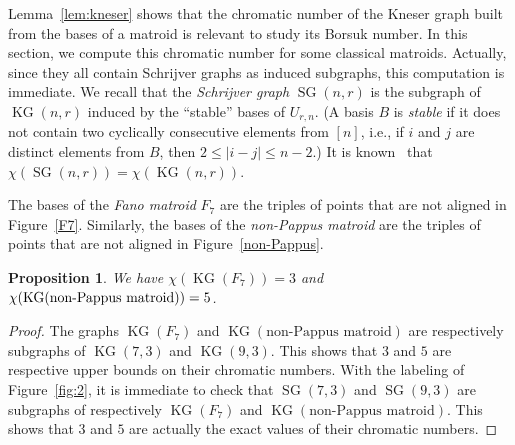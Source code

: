 \documentclass[12pt]{amsart}
\theoremstyle{plain}
\newtheorem{proposition}[theorem]{Proposition}
\theoremstyle{definition}
\theoremstyle{remark}
\renewcommand{\leq}{\leqslant}
\def \KG {\operatorname{KG}}
\def \SG {\operatorname{SG}}
\begin{document}
Lemma~\ref{lem:kneser} shows that the chromatic number of the Kneser graph built from the bases of a matroid is relevant to study its Borsuk number. In this section, we compute this chromatic number for some classical matroids. Actually, since they all contain Schrijver graphs as induced subgraphs, this computation is immediate. We recall that the {\em Schrijver graph} $\SG(n,r)$ is the subgraph of $\KG(n,r)$ induced by the ``stable'' bases of $U_{r,n}$. (A basis $B$ is {\em stable} if it does not contain two cyclically consecutive elements from $[n]$, i.e., if $i$ and $j$ are distinct elements from $B$, then $2 \leq |i-j| \leq n-2$.) It is known~\cite{schrijver1978vertex} that $\chi(\SG(n,r)) = \chi(\KG(n,r))$.

The bases of the {\em Fano matroid} $F_7$ are the triples of points that are not aligned in Figure~\ref{F7}. Similarly, the bases of the {\em non-Pappus matroid} are the triples of points that are not aligned in Figure~\ref{non-Pappus}.

\begin{proposition}\label{prop:pappus} 
We have $\chi(\KG(F_7)) = 3$ and $\chi(\KG(\textup{non-Pappus matroid})) = 5$.
\end{proposition}

\begin{proof}
The graphs $\KG(F_7)$ and $\KG(\text{non-Pappus matroid})$ are respectively subgraphs of $\KG(7,3)$ and $\KG(9,3)$. This  shows that $3$ and $5$ are respective upper bounds on their chromatic numbers. With the labeling of Figure~\ref{fig:2}, it is immediate to check that $\SG(7, 3)$ and $\SG(9, 3)$ are subgraphs of respectively $\KG(F_7)$ and $\KG(\text{non-Pappus matroid})$. This shows that $3$ and $5$ are actually the exact values of their chromatic numbers.
\end{proof}
\end{document}
